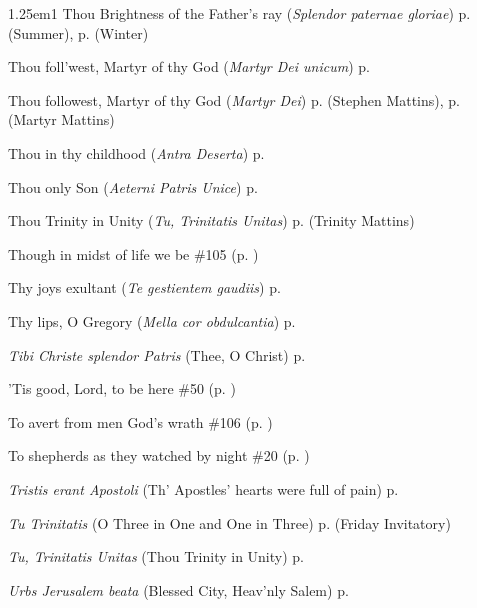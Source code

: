 \begin{hangparas}{1.25em}{1}
Thou Brightness of the Father's ray (\textit{Splendor paternae gloriae}) \dotfill p. \pageref{MondayMattinsSummer} (Summer), p. \pageref{MondayMattinsWinter} (Winter)
\par\noindent
Thou foll'west, Martyr of thy God (\textit{Martyr Dei unicum}) \dotfill p. \pageref{MartyrMattinsEaster}
\par\noindent
Thou followest, Martyr of thy God (\textit{Martyr Dei}) \dotfill p. \pageref{StephenMattins} (Stephen Mattins), p. \pageref{MartyrMattins} (Martyr Mattins)
\par\noindent
Thou in thy childhood (\textit{Antra Deserta}) \dotfill p. \pageref{JohnBaptistInvitatory}
\par\noindent
Thou only Son (\textit{Aeterni Patris Unice}) \dotfill p. \pageref{MaryMagdaleneMattins}
\par\noindent
Thou Trinity in Unity (\textit{Tu, Trinitatis Unitas}) \dotfill p. \pageref{TrinityMattins} (Trinity Mattins)
\par\noindent
Though in midst of life we be \dotfill \#105 (p. \pageref{Hymn105})
\par\noindent
Thy joys exultant (\textit{Te gestientem gaudiis}) \dotfill p. \pageref{HolyRosaryIIEvensong}
\par\noindent
Thy lips, O Gregory (\textit{Mella cor obdulcantia}) \dotfill p. \pageref{GregoryMattins}
\par\noindent
\textit{Tibi Christe splendor Patris} (Thee, O Christ) \dotfill p. \pageref{MichaelEvensong}
\par\noindent
'Tis good, Lord, to be here \dotfill \#50 (p. \pageref{Hymn50})
\par\noindent
To avert from men God's wrath \dotfill \#106 (p. \pageref{Hymn106})
\par\noindent
To shepherds as they watched by night \dotfill \#20 (p. \pageref{Hymn20})
\par\noindent
\textit{Tristis erant Apostoli} (Th' Apostles' hearts were full of pain) \dotfill p. \pageref{ApostlesEvensongEaster}
\par\noindent
\textit{Tu Trinitatis} (O Three in One and One in Three) \dotfill p. \pageref{FridayInvitatory} (Friday Invitatory)
\par\noindent
\textit{Tu, Trinitatis Unitas} (Thou Trinity in Unity) \dotfill p. \pageref{TrinityMattins}
\par\noindent
\textit{Urbs Jerusalem beata} (Blessed City, Heav'nly Salem) \dotfill p. \pageref{DedicationEvensong}
\par\noindent

\end{hangparas}
